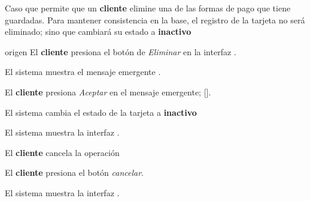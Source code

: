 %
%

{
  Caso que permite que un \textbf{cliente} elimine una de las formas de pago
  que tiene guardadas. Para mantener consistencia en la base, el registro de
  la tarjeta no será eliminado; sino que cambiará su estado a \textbf{inactivo}

  \begin{trayectoriaPrincipal}

    \item[origen] El \textbf{cliente} presiona el botón de \textit{Eliminar}
      en la interfaz .

    \item El sistema muestra el mensaje emergente
      .

    \item El \textbf{cliente} presiona \textit{Aceptar} en el mensaje
      emergente; [].

    \item El sistema cambia el estado de la tarjeta a \textbf{inactivo}

    \item El sistema muestra la interfaz
      .

  \end{trayectoriaPrincipal}


  \begin{trayectoriaAlternativa}
    {El \textbf{cliente} cancela la operación}

    \item El \textbf{cliente} presiona el botón \textit{cancelar}.

    \item El sistema muestra la interfaz
      .

  \end{trayectoriaAlternativa}
}
